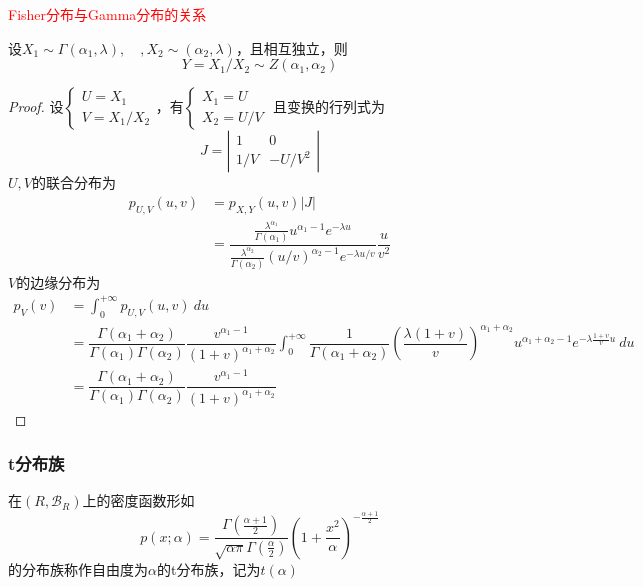 \textcolor{red}{Fisher分布与Gamma分布的关系}

设$X_1\sim \Gamma(\alpha_1,\lambda),\quad, X_2\sim (\alpha_2, \lambda)$，且相互独立，则
\[
    Y = X_1/X_2\sim Z(\alpha_1,\alpha_2)
\]
\begin{proof}
    设$\left\{\begin{array}{l}
        U = X_1\\
        V = X_1/X_2
    \end{array}\right.$，有$\left\{\begin{array}{l}
        X_1 = U\\
        X_2 = U/V
    \end{array}\right.$
    且变换的行列式为
    \[
        J = \left\lvert \begin{matrix}
            1 & 0\\
            1/V & -U/V^2
        \end{matrix} \right\rvert  
    \]
    $U,V$的联合分布为
    \[
        \begin{array}{ll}
            p_{U,V}(u,v) &= p_{X,Y}(u,v)|J|\\
            &=\dfrac{\frac{\lambda^{\alpha_1}}{\Gamma(\alpha_1)}u^{\alpha_1-1}e^{-\lambda u}}{\frac{\lambda^{\alpha_2}}{\Gamma(\alpha_2)}(u/v)^{\alpha_2-1}e^{-\lambda u/v}}\dfrac{u}{v^2}
        \end{array}
    \]
    $V$的边缘分布为
    \[
        \begin{array}{ll}
            p_{V}(v) &= \displaystyle\int_{0}^{+\infty}p_{U,V}(u,v)\ du\\
            &=\dfrac{\Gamma(\alpha_1+\alpha_2)}{\Gamma(\alpha_1)\Gamma(\alpha_2)}\dfrac{v^{\alpha_1-1}}{(1+v)^{\alpha_1+\alpha_2}}\displaystyle\int_{0}^{+\infty}\dfrac{1}{\Gamma(\alpha_1+\alpha_2)}\left(\dfrac{\lambda(1+v)}{v}\right)^{\alpha_1+\alpha_2}u^{\alpha_1+\alpha_2-1}e^{-\lambda\frac{1+v}{v}u}\ du\\
            &=\dfrac{\Gamma(\alpha_1+\alpha_2)}{\Gamma(\alpha_1)\Gamma(\alpha_2)}\dfrac{v^{\alpha_1-1}}{(1+v)^{\alpha_1+\alpha_2}}
        \end{array}
    \]
\end{proof}

\subsubsection{t分布族}

\begin{definition}[t分布族]
    在$(R,\mathscr{B}_{R})$上的密度函数形如
    \[
        p(x;\alpha) = \dfrac{\Gamma(\frac{\alpha+1}{2})}{\sqrt{\alpha \pi}\Gamma(\frac{\alpha}{2})}(1+\dfrac{x^2}{\alpha})^{-\frac{\alpha+1}{2}}
    \]的分布族称作自由度为$\alpha$的t分布族，记为$t(\alpha)$
\end{definition}

